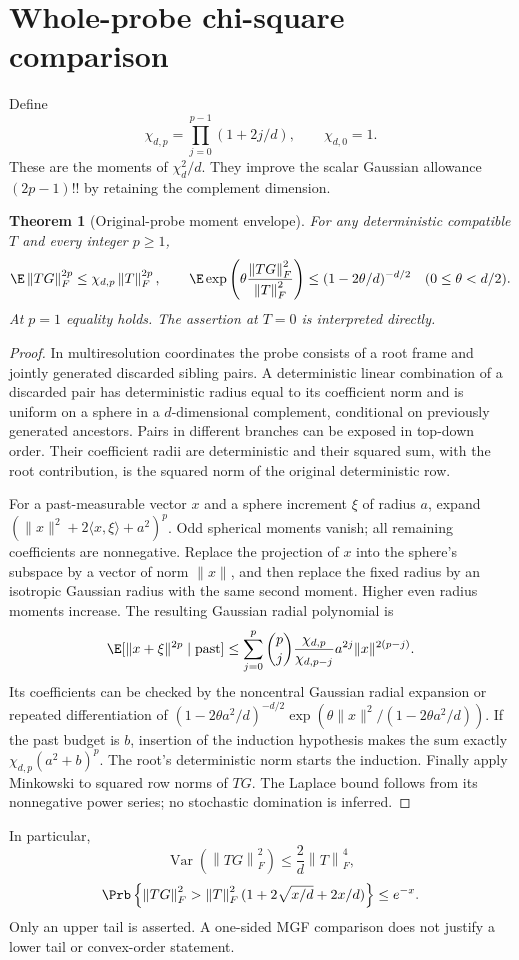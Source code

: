 \documentclass[11pt,oneside,openany,a4paper]{book}
\numberwithin{equation}{chapter}
\newtheorem{theorem}{Theorem}[chapter]
\theoremstyle{definition}
\theoremstyle{remark}
\newcommand{\F}[1]{\left\lVert#1\right\rVert_F}
\DeclareMathOperator{\Var}{Var}\DeclareMathOperator{\supp}{supp}
\begin{document}
\section{Whole-probe chi-square comparison}\label{base:new:chi}
Define
\[
 \chi_{d,p}=\prod_{j=0}^{p-1}(1+2j/d),\qquad\chi_{d,0}=1.
\]
These are the moments of $\chi_d^2/d$. They improve the scalar Gaussian allowance $(2p-1)!!$ by retaining the complement dimension.

\begin{theorem}[Original-probe moment envelope]\label{base:new:probe-chi}
For any deterministic compatible $T$ and every integer $p\ge1$,
\[
 \E\F{TG}^{2p}\le\chi_{d,p}\F T^{2p},\qquad
 \E\exp\left(\theta\frac{\F{TG}^2}{\F T^2}\right)
 \le(1-2\theta/d)^{-d/2}\quad(0\le\theta<d/2).
\]
At $p=1$ equality holds. The assertion at $T=0$ is interpreted directly.
\end{theorem}
\begin{proof}
In multiresolution coordinates the probe consists of a root frame and jointly generated discarded sibling pairs. A deterministic linear combination of a discarded pair has deterministic radius equal to its coefficient norm and is uniform on a sphere in a $d$-dimensional complement, conditional on previously generated ancestors. Pairs in different branches can be exposed in top-down order. Their coefficient radii are deterministic and their squared sum, with the root contribution, is the squared norm of the original deterministic row.

For a past-measurable vector $x$ and a sphere increment $\xi$ of radius $a$, expand $(\|x\|^2+2\langle x,\xi\rangle+a^2)^p$. Odd spherical moments vanish; all remaining coefficients are nonnegative. Replace the projection of $x$ into the sphere's subspace by a vector of norm $\|x\|$, and then replace the fixed radius by an isotropic Gaussian radius with the same second moment. Higher even radius moments increase. The resulting Gaussian radial polynomial is
\[
 \E[\|x+\xi\|^{2p}\mid\text{past}]
 \le\sum_{j=0}^{p}\binom pj\frac{\chi_{d,p}}{\chi_{d,p-j}}
 a^{2j}\|x\|^{2(p-j)}.
\]
Its coefficients can be checked by the noncentral Gaussian radial expansion or repeated differentiation of $(1-2\theta a^2/d)^{-d/2}\exp(\theta\|x\|^2/(1-2\theta a^2/d))$. If the past budget is $b$, insertion of the induction hypothesis makes the sum exactly $\chi_{d,p}(a^2+b)^p$. The root's deterministic norm starts the induction. Finally apply Minkowski to squared row norms of $TG$. The Laplace bound follows from its nonnegative power series; no stochastic domination is inferred.
\end{proof}
In particular,
\[
 \Var(\F{TG}^2)\le\frac2d\F T^4,
\]
\begin{equation}\label{base:new:probe-tail}
 \Prb\left\{\F{TG}^2>\F T^2(1+2\sqrt{x/d}+2x/d)\right\}\le e^{-x}.
\end{equation}
Only an upper tail is asserted. A one-sided MGF comparison does not justify a lower tail or convex-order statement.
\end{document}
